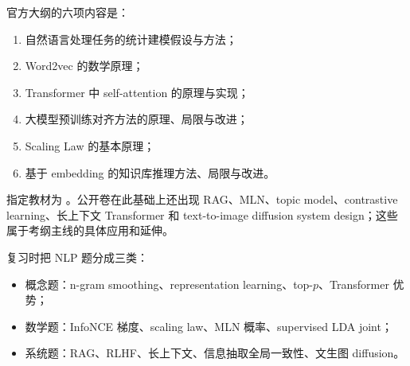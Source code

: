\documentclass[11pt]{ctexart}
\begin{document}
官方大纲的六项内容是：

\begin{enumerate}
  \item 自然语言处理任务的统计建模假设与方法；
  \item Word2vec 的数学原理；
  \item Transformer 中 self-attention 的原理与实现；
  \item 大模型预训练对齐方法的原理、局限与改进；
  \item Scaling Law 的基本原理；
  \item 基于 embedding 的知识库推理方法、局限与改进。
\end{enumerate}

指定教材为 \textcite{jurafsky2026slp,goldberg2017nnnlp}。公开卷在此基础上还出现 RAG、MLN、topic model、contrastive learning、长上下文 Transformer 和 text-to-image diffusion system design；这些属于考纲主线的具体应用和延伸。

复习时把 NLP 题分成三类：

\begin{itemize}
  \item 概念题：n-gram smoothing、representation learning、top-\(p\)、Transformer 优势；
  \item 数学题：InfoNCE 梯度、scaling law、MLN 概率、supervised LDA joint；
  \item 系统题：RAG、RLHF、长上下文、信息抽取全局一致性、文生图 diffusion。
\end{itemize}

\NLPTextbooks

\printbibliography[heading=bibintoc,title={参考文献与官方来源}]
\end{document}
